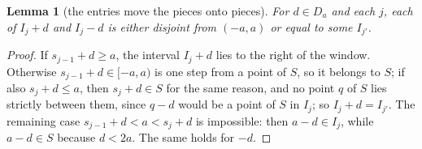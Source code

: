 \documentclass[11pt]{article}
\newtheorem{lemma}[theorem]{Lemma}
\theoremstyle{definition}
\theoremstyle{remark}
\begin{document}
\begin{lemma}[the entries move the pieces onto pieces]\label{lem:pieces}
For $d\in D_a$ and each $j$, each of $I_j+d$ and $I_j-d$ is either disjoint from $(-a,a)$ or equal to some $I_{j'}$.
\end{lemma}
\begin{proof}
If $s_{j-1}+d\ge a$, the interval $I_j+d$ lies to the right of the window. Otherwise $s_{j-1}+d\in[-a,a)$ is one step from a point of $S$, so it belongs to $S$; if also $s_j+d\le a$, then $s_j+d\in S$ for the same reason, and no point $q$ of $S$ lies strictly between them, since $q-d$ would be a point of $S$ in $I_j$; so $I_j+d=I_{j'}$. The remaining case $s_{j-1}+d<a<s_j+d$ is impossible: then $a-d\in I_j$, while $a-d\in S$ because $d<2a$. The same holds for $-d$.
\end{proof}
\end{document}
